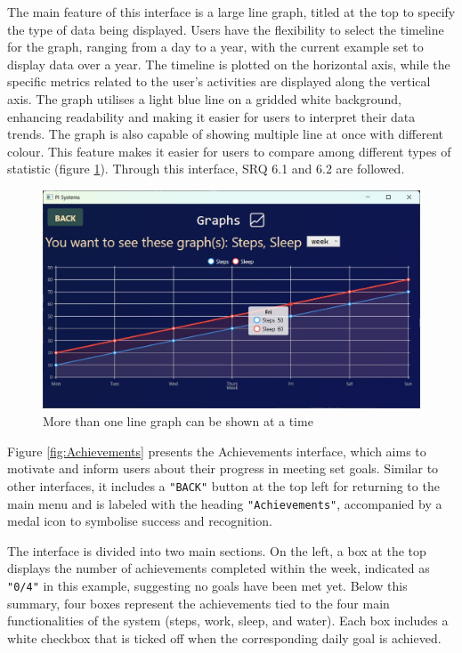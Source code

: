\documentclass[11pt]{article}
\begin{document}
The main feature of this interface is a large line graph, titled at the top to
specify the type of data being displayed. Users have the flexibility to select
the timeline for the graph, ranging from a day to a year, with the current
example set to display data over a year. The timeline is plotted on the
horizontal axis, while the specific metrics related to the user’s activities
are displayed along the vertical axis. The graph utilises a light blue line on
a gridded white background, enhancing readability and making it easier for
users to interpret their data trends. The graph is also capable of showing
multiple line at once with different colour. This feature makes it easier for
users to compare among different types of statistic (figure
\ref{fig:2_graphs}). Through this interface, SRQ 6.1 and 6.2 are followed.\par

\begin{figure}[!ht]
  \centering
  \includegraphics[width = 0.5\linewidth]{2 line graph}
  \caption{More than one line graph can be shown at a time}
  \label{fig:2_graphs}
\end{figure}

Figure \ref{fig:Achievements} presents the Achievements interface, which aims
to motivate and inform users about their progress in meeting set goals. Similar
to other interfaces, it includes a \texttt{"BACK"} button at the top left for
returning to the main menu and is labeled with the heading
\texttt{"Achievements"}, accompanied by a medal icon to symbolise success and
recognition.\par

The interface is divided into two main sections. On the left, a box at the top
displays the number of achievements completed within the week, indicated as
\texttt{"0/4"} in this example, suggesting no goals have been met yet. Below
this summary, four boxes represent the achievements tied to the four main
functionalities of the system (steps, work, sleep, and water). Each box
includes a white checkbox that is ticked off when the corresponding daily goal
is achieved.\par
\end{document}
